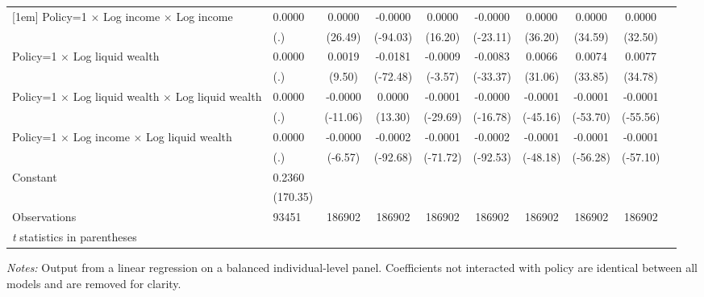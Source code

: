 \begin{table}[h!tbp]
\begin{tabular}{p{1.2in}l*{8}{c}}
[1em]
Policy=1 $\times$ Log income $\times$ Log income&      0.0000&      0.0000&     -0.0000&      0.0000&     -0.0000&      0.0000&      0.0000&      0.0000\\
                    &         (.)&     (26.49)&    (-94.03)&     (16.20)&    (-23.11)&     (36.20)&     (34.59)&     (32.50)\\
[1em]
Policy=1 $\times$ Log liquid wealth&      0.0000&      0.0019&     -0.0181&     -0.0009&     -0.0083&      0.0066&      0.0074&      0.0077\\
                    &         (.)&      (9.50)&    (-72.48)&     (-3.57)&    (-33.37)&     (31.06)&     (33.85)&     (34.78)\\
[1em]
Policy=1 $\times$ Log liquid wealth $\times$ Log liquid wealth&      0.0000&     -0.0000&      0.0000&     -0.0001&     -0.0000&     -0.0001&     -0.0001&     -0.0001\\
                    &         (.)&    (-11.06)&     (13.30)&    (-29.69)&    (-16.78)&    (-45.16)&    (-53.70)&    (-55.56)\\
[1em]
Policy=1 $\times$ Log income $\times$ Log liquid wealth&      0.0000&     -0.0000&     -0.0002&     -0.0001&     -0.0002&     -0.0001&     -0.0001&     -0.0001\\
                    &         (.)&     (-6.57)&    (-92.68)&    (-71.72)&    (-92.53)&    (-48.18)&    (-56.28)&    (-57.10)\\
[1em]
Constant            &      0.2360&       &     &    &    &    &    & \\
                    &    (170.35)&      &    &    &    &    &    & \\
\hline
Observations        &       93451&      186902&      186902&      186902&      186902&      186902&      186902&      186902\\
\hline\hline
\multicolumn{9}{l}{\footnotesize \textit{t} statistics in parentheses}\\
\end{tabular}
\textit{Notes:} Output from a linear regression on a balanced individual-level panel. Coefficients not interacted with policy are identical between all models and are removed for clarity.
\end{table}
